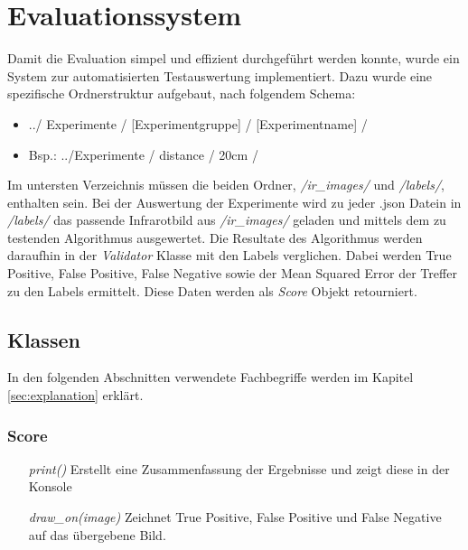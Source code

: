 \section{Evaluationssystem}

Damit die Evaluation simpel und effizient durchgeführt werden konnte, wurde ein System zur automatisierten Testauswertung implementiert. Dazu wurde eine spezifische Ordnerstruktur aufgebaut, nach folgendem Schema:

\begin{itemize}
	\item ../ Experimente / [Experimentgruppe] / [Experimentname] /
	\item Bsp.: ../Experimente / distance / 20cm / 
\end{itemize}

\noindent
Im untersten Verzeichnis müssen die beiden Ordner, \textit{/ir\_images/} und \textit{/labels/}, enthalten sein. Bei der Auswertung der Experimente wird zu jeder .json Datein in \textit{/labels/} das passende Infrarotbild aus \textit{/ir\_images/} geladen und mittels dem zu testenden Algorithmus ausgewertet. Die Resultate des Algorithmus werden daraufhin in der \textit{Validator} Klasse mit den Labels verglichen. Dabei werden True Positive, False Positive, False Negative sowie der Mean Squared Error der Treffer zu den Labels ermittelt. Diese Daten werden als \textit{Score} Objekt retourniert.\\

\subsection{Klassen}

In den folgenden Abschnitten verwendete Fachbegriffe werden im Kapitel \ref{sec:explanation} erklärt.

\subsubsection{Score}

\begin{itemize}[leftmargin=*,labelindent=3cm, labelsep=1cm]
	\item[\textit{print()}] Erstellt eine Zusammenfassung der Ergebnisse und zeigt diese in der Konsole
	\item[\textit{draw\_on(image)}] Zeichnet True Positive, False Positive und False Negative auf das übergebene Bild.
\end{itemize}

